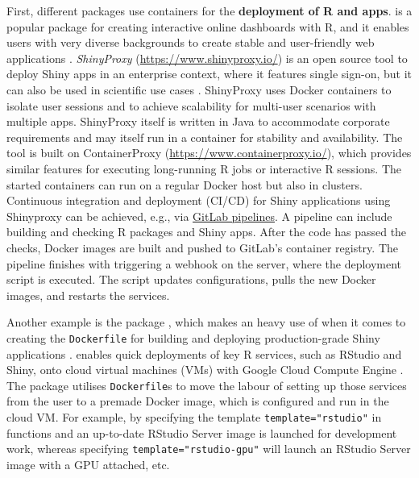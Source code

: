 First, different packages use containers for the \textbf{deployment of R
and  apps}.  is a popular package for creating
interactive online dashboards with R, and it enables users with very
diverse backgrounds to create stable and user-friendly web applications
\citep{cran_shiny}. \emph{ShinyProxy} (\url{https://www.shinyproxy.io/})
is an open source tool to deploy Shiny apps in an enterprise context,
where it features single sign-on, but it can also be used in scientific
use cases
\citep[e.g., ][]{savini_epiexplorer_2019,glouzon_structurexplor_2017}.
ShinyProxy uses Docker containers to isolate user sessions and to
achieve scalability for multi-user scenarios with multiple apps.
ShinyProxy itself is written in Java to accommodate corporate
requirements and may itself run in a container for stability and
availability. The tool is built on ContainerProxy
(\url{https://www.containerproxy.io/}), which provides similar features
for executing long-running R jobs or interactive R sessions. The started
containers can run on a regular Docker host but also in clusters.
Continuous integration and deployment (CI/CD) for Shiny applications
using Shinyproxy can be achieved, e.g., via
\href{https://docs.gitlab.com/ee/ci/pipelines.html}{GitLab pipelines}. A
pipeline can include building and checking R packages and Shiny apps.
After the code has passed the checks, Docker images are built and pushed
to GitLab's container registry. The pipeline finishes with triggering a
webhook on the server, where the deployment script is executed. The
script updates configurations, pulls the new Docker images, and restarts
the services.

Another example is the package , which makes an heavy use
of  when it comes to creating the \texttt{Dockerfile}
for building and deploying production-grade Shiny applications
\citep{cran_golem}.  enables quick
deployments of key R services, such as RStudio and Shiny, onto cloud
virtual machines (VMs) with Google Cloud Compute Engine
\citep{googleComputeEngineR_2019}. The package utilises
\texttt{Dockerfile}s to move the labour of setting up those services
from the user to a premade Docker image, which is configured and run in
the cloud VM. For example, by specifying the template
\texttt{template="rstudio"} in functions  and
 an up-to-date RStudio Server image is launched for
development work, whereas specifying \texttt{template="rstudio-gpu"}
will launch an RStudio Server image with a GPU attached, etc.

